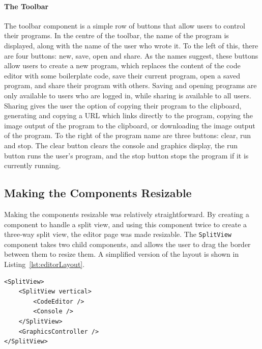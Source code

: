 \documentclass[../main.tex]{subfiles}
\begin{document}
                \paragraph{The Toolbar}
                    The toolbar component is a simple row of buttons that allow users to control
                        their programs.
                    In the centre of the toolbar, the name of the program is displayed, along with
                        the name of the user who wrote it.
                    To the left of this, there are four buttons: new, save, open and share.
                    As the names suggest, these buttons allow users to create a new program, which
                        replaces the content of the code editor with some boilerplate code, save their
                        current program, open a saved program, and share their program with others.
                    Saving and opening programs are only available to users who are logged in,
                        while sharing is available to all users.
                    Sharing gives the user the option of copying their program to the clipboard,
                        generating and copying a URL which links directly to the program, copying the
                        image output of the program to the clipboard, or downloading the image output
                        of the program.
                    To the right of the program name are three buttons: clear, run and stop.
                    The clear button clears the console and graphics display, the run button runs
                        the user's program, and the stop button stops the program if it is currently
                        running.

        \subsection{Making the Components Resizable}
            Making the components resizable was relatively straightforward.
            By creating a component to handle a split view, and using this component twice
                to create a three-way split view, the editor page was made resizable.
            The \texttt{SplitView} component takes two child components, and allows the
                user to drag the border between them to resize them.
            A simplified version of the layout is shown in Listing~\ref{lst:editorLayout}.

            \begin{lstlisting}[caption={A simplified version of the editor page  layout.}, label={lst:editorLayout}]
<SplitView>
    <SplitView vertical>
        <CodeEditor />
        <Console />
    </SplitView>
    <GraphicsController />
</SplitView>\end{lstlisting}
\end{document}

